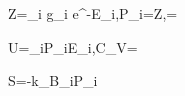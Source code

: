 Z=\sum_i g_i e^{-\beta E_i},\qquad P_i=Z,\qquad \beta=

U=\sum_iP_iE_i,\qquad C_V=

S=-k_B\sum_iP_i\ln{}
